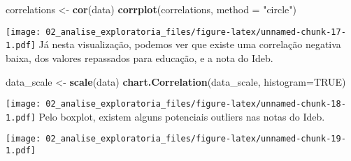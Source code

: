 \documentclass[
]{article}
\newenvironment{Shaded}{\begin{snugshade}}{\end{snugshade}}
\newcommand{\DataTypeTok}[1]{\textcolor[rgb]{0.13,0.29,0.53}{#1}}
\newcommand{\KeywordTok}[1]{\textcolor[rgb]{0.13,0.29,0.53}{\textbf{#1}}}
\newcommand{\NormalTok}[1]{#1}
\newcommand{\OperatorTok}[1]{\textcolor[rgb]{0.81,0.36,0.00}{\textbf{#1}}}
\newcommand{\OtherTok}[1]{\textcolor[rgb]{0.56,0.35,0.01}{#1}}
\newcommand{\StringTok}[1]{\textcolor[rgb]{0.31,0.60,0.02}{#1}}
\begin{document}
\begin{Shaded}
\begin{Highlighting}[]
\NormalTok{correlations \textless{}{-}}\StringTok{ }\KeywordTok{cor}\NormalTok{(data)}
\KeywordTok{corrplot}\NormalTok{(correlations, }\DataTypeTok{method =} \StringTok{"circle"}\NormalTok{)}
\end{Highlighting}
\end{Shaded}

\texttt{[image: 02\_analise\_exploratoria\_files/figure-latex/unnamed-chunk-17-1.pdf]}
Já nesta visualização, podemos ver que existe uma correlação negativa
baixa, dos valores repassados para educação, e a nota do Ideb.

\begin{Shaded}
\begin{Highlighting}[]
\NormalTok{data\_scale \textless{}{-}}\StringTok{ }\KeywordTok{scale}\NormalTok{(data)}
\KeywordTok{chart.Correlation}\NormalTok{(data\_scale, }\DataTypeTok{histogram=}\OtherTok{TRUE}\NormalTok{)}
\end{Highlighting}
\end{Shaded}

\texttt{[image: 02\_analise\_exploratoria\_files/figure-latex/unnamed-chunk-18-1.pdf]}
Pelo boxplot, existem alguns potenciais outliers nas notas do Ideb.

\begin{Shaded}
\end{Shaded}

\texttt{[image: 02\_analise\_exploratoria\_files/figure-latex/unnamed-chunk-19-1.pdf]}

\begin{Shaded}
\end{Shaded}
\end{document}
